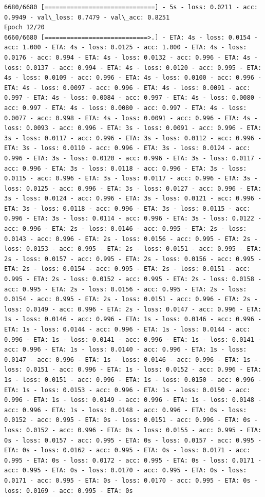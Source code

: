 \documentclass[11pt]{article}
\begin{document}
\begin{Verbatim}[commandchars=\\\{\}]
6680/6680 [==============================] - 5s - loss: 0.0211 - acc: 0.9949 - val\_loss: 0.7479 - val\_acc: 0.8251
Epoch 12/20
6660/6680 [============================>.] - ETA: 4s - loss: 0.0154 - acc: 1.000 - ETA: 4s - loss: 0.0125 - acc: 1.000 - ETA: 4s - loss: 0.0176 - acc: 0.994 - ETA: 4s - loss: 0.0132 - acc: 0.996 - ETA: 4s - loss: 0.0137 - acc: 0.994 - ETA: 4s - loss: 0.0120 - acc: 0.995 - ETA: 4s - loss: 0.0109 - acc: 0.996 - ETA: 4s - loss: 0.0100 - acc: 0.996 - ETA: 4s - loss: 0.0097 - acc: 0.996 - ETA: 4s - loss: 0.0091 - acc: 0.997 - ETA: 4s - loss: 0.0084 - acc: 0.997 - ETA: 4s - loss: 0.0080 - acc: 0.997 - ETA: 4s - loss: 0.0080 - acc: 0.997 - ETA: 4s - loss: 0.0077 - acc: 0.998 - ETA: 4s - loss: 0.0091 - acc: 0.996 - ETA: 4s - loss: 0.0093 - acc: 0.996 - ETA: 3s - loss: 0.0091 - acc: 0.996 - ETA: 3s - loss: 0.0117 - acc: 0.996 - ETA: 3s - loss: 0.0112 - acc: 0.996 - ETA: 3s - loss: 0.0110 - acc: 0.996 - ETA: 3s - loss: 0.0124 - acc: 0.996 - ETA: 3s - loss: 0.0120 - acc: 0.996 - ETA: 3s - loss: 0.0117 - acc: 0.996 - ETA: 3s - loss: 0.0118 - acc: 0.996 - ETA: 3s - loss: 0.0115 - acc: 0.996 - ETA: 3s - loss: 0.0117 - acc: 0.996 - ETA: 3s - loss: 0.0125 - acc: 0.996 - ETA: 3s - loss: 0.0127 - acc: 0.996 - ETA: 3s - loss: 0.0124 - acc: 0.996 - ETA: 3s - loss: 0.0121 - acc: 0.996 - ETA: 3s - loss: 0.0118 - acc: 0.996 - ETA: 3s - loss: 0.0115 - acc: 0.996 - ETA: 3s - loss: 0.0114 - acc: 0.996 - ETA: 3s - loss: 0.0122 - acc: 0.996 - ETA: 2s - loss: 0.0146 - acc: 0.995 - ETA: 2s - loss: 0.0143 - acc: 0.996 - ETA: 2s - loss: 0.0156 - acc: 0.995 - ETA: 2s - loss: 0.0153 - acc: 0.995 - ETA: 2s - loss: 0.0151 - acc: 0.995 - ETA: 2s - loss: 0.0157 - acc: 0.995 - ETA: 2s - loss: 0.0156 - acc: 0.995 - ETA: 2s - loss: 0.0154 - acc: 0.995 - ETA: 2s - loss: 0.0151 - acc: 0.995 - ETA: 2s - loss: 0.0152 - acc: 0.995 - ETA: 2s - loss: 0.0158 - acc: 0.995 - ETA: 2s - loss: 0.0156 - acc: 0.995 - ETA: 2s - loss: 0.0154 - acc: 0.995 - ETA: 2s - loss: 0.0151 - acc: 0.996 - ETA: 2s - loss: 0.0149 - acc: 0.996 - ETA: 2s - loss: 0.0147 - acc: 0.996 - ETA: 1s - loss: 0.0146 - acc: 0.996 - ETA: 1s - loss: 0.0146 - acc: 0.996 - ETA: 1s - loss: 0.0144 - acc: 0.996 - ETA: 1s - loss: 0.0144 - acc: 0.996 - ETA: 1s - loss: 0.0141 - acc: 0.996 - ETA: 1s - loss: 0.0141 - acc: 0.996 - ETA: 1s - loss: 0.0140 - acc: 0.996 - ETA: 1s - loss: 0.0147 - acc: 0.996 - ETA: 1s - loss: 0.0146 - acc: 0.996 - ETA: 1s - loss: 0.0151 - acc: 0.996 - ETA: 1s - loss: 0.0152 - acc: 0.996 - ETA: 1s - loss: 0.0151 - acc: 0.996 - ETA: 1s - loss: 0.0150 - acc: 0.996 - ETA: 1s - loss: 0.0153 - acc: 0.996 - ETA: 1s - loss: 0.0150 - acc: 0.996 - ETA: 1s - loss: 0.0149 - acc: 0.996 - ETA: 1s - loss: 0.0148 - acc: 0.996 - ETA: 1s - loss: 0.0148 - acc: 0.996 - ETA: 0s - loss: 0.0152 - acc: 0.995 - ETA: 0s - loss: 0.0151 - acc: 0.996 - ETA: 0s - loss: 0.0152 - acc: 0.996 - ETA: 0s - loss: 0.0155 - acc: 0.995 - ETA: 0s - loss: 0.0157 - acc: 0.995 - ETA: 0s - loss: 0.0157 - acc: 0.995 - ETA: 0s - loss: 0.0162 - acc: 0.995 - ETA: 0s - loss: 0.0171 - acc: 0.995 - ETA: 0s - loss: 0.0172 - acc: 0.995 - ETA: 0s - loss: 0.0171 - acc: 0.995 - ETA: 0s - loss: 0.0170 - acc: 0.995 - ETA: 0s - loss: 0.0171 - acc: 0.995 - ETA: 0s - loss: 0.0170 - acc: 0.995 - ETA: 0s - loss: 0.0169 - acc: 0.995 - ETA: 0s 
\end{Verbatim}
\end{document}
